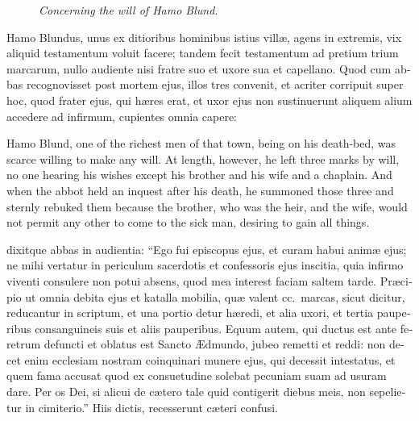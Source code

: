 \documentclass{book}
\newcommand{\blockhead}[4][]{
\begin{figure}
\centering
\vspace{#4}
\parbox{2.75cm}{\begin{center}\footnotesize \color{BrickRed} \emph{#2}\\ #1 \end{center}}
\end{figure}
}
\begin{document}
\begin{paracol}{2}
\switchcolumn*

\begin{otherlanguage}{latin}
\blockhead{Concerning the will of Hamo Blund.}{3}{-.55cm} 
Hamo Blundus, unus ex ditioribus hominibus istius vill\ae{}, agens in extremis, vix aliquid testamentum voluit facere; tandem fecit testamentum ad pretium trium marcarum, nullo audiente nisi fratre suo et uxore sua et capellano. Quod cum abbas recognovisset post mortem ejus, illos tres convenit, et acriter corripuit super hoc, quod frater ejus, qui h\ae{}res erat, et uxor ejus non sustinuerunt aliquem alium accedere ad infirmum, cupientes omnia capere:

\end{otherlanguage}

\switchcolumn

Hamo Blund, one of the richest men of that town, being on his death-bed, was scarce willing to make any will. At length, however, he left three marks by will, no one hearing his wishes except his brother and his wife and a chaplain. And when the abbot held an inquest after his death, he summoned those three and sternly rebuked them because the brother, who was the heir, and the wife, would not permit any other to come to the sick man, desiring to gain all things.

\switchcolumn*

\begin{otherlanguage}{latin}
dixitque abbas in audientia: ``Ego fui episcopus ejus, et curam habui anim\ae{} ejus; ne mihi vertatur in periculum sacerdotis et confessoris ejus inscitia, quia infirmo viventi consulere non potui absens, quod mea interest faciam saltem tarde. Pr\ae{}cipio ut omnia debita ejus et katalla mobilia, qu\ae{} valent cc.\ marcas, sicut dicitur, reducantur in scriptum, et una portio detur h\ae{}redi, et alia uxori, et tertia pauperibus consanguineis suis et aliis pauperibus. Equum autem, qui ductus est ante feretrum defuncti et oblatus est Sancto \AE{}dmundo, jubeo remetti et reddi: non decet enim ecclesiam nostram coinquinari munere ejus, qui decessit intestatus, et quem fama accusat quod ex consuetudine solebat pecuniam suam ad usuram dare. Per os Dei, si alicui de c\ae{}tero tale quid contigerit diebus meis, non sepelietur in cimiterio.'' Hiis dictis, recesserunt c\ae{}teri confusi.
\end{otherlanguage}

\switchcolumn


\end{paracol}
\end{document}
